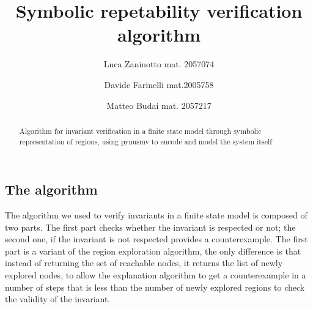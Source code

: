 \documentclass[9pt,oneside]{amsart}
\title{Symbolic repetability verification algorithm}
\author{
  Luca Zaninotto mat. 2057074 
  \and
  Davide Farinelli mat.2005758
  \and
  Matteo Budai mat. 2057217
}
\begin{document}
\begin{abstract}
  Algorithm for invariant verification in a finite state model through
  symbolic representation of regions, using pynusmv to encode and
  model the system itself
\end{abstract}
\maketitle
\setlength{\columnsep}{20pt}
\begin{multicols}{2}
\section{The algorithm}\label{algo}
The algorithm we used to verify invariants in a finite state model is
composed of two parts. The first part checks whether the invariant is
respected or not; the second one, if the invariant is not respected
provides a counterexample. The first part is a variant of the region
exploration algorithm, the only difference is that instead of returning
the set of reachable nodes, it returns the list of newly explored nodes,
to allow the explanation algorithm to get a counterexample in a number
of steps that is less than the number of newly explored regions to check
the validity of the invariant.


\end{multicols}
\end{document}

